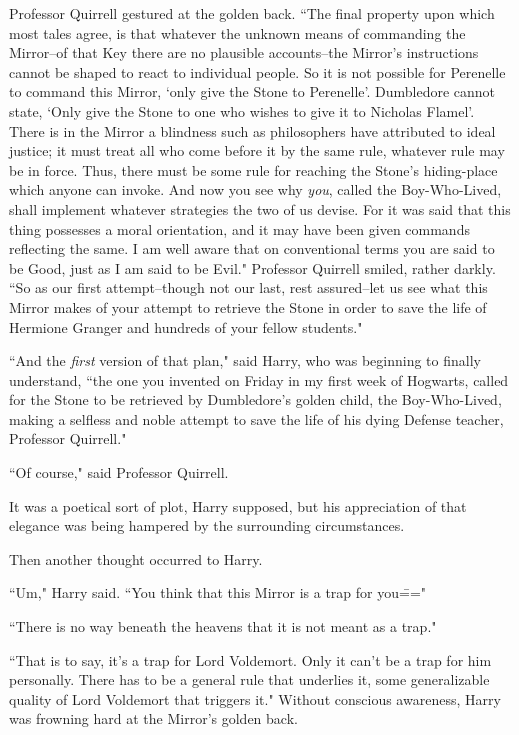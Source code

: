 Professor Quirrell gestured at the golden back. ``The final property upon which most tales agree, is that whatever the unknown means of commanding the Mirror\---of that Key there are no plausible accounts\---the Mirror's instructions cannot be shaped to react to individual people. So it is not possible for Perenelle to command this Mirror, `only give the Stone to Perenelle'. Dumbledore cannot state, `Only give the Stone to one who wishes to give it to Nicholas Flamel'. There is in the Mirror a blindness such as philosophers have attributed to ideal justice; it must treat all who come before it by the same rule, whatever rule may be in force. Thus, there must be some rule for reaching the Stone's hiding-place which anyone can invoke. And now you see why \emph{you}, called the Boy-Who-Lived, shall implement whatever strategies the two of us devise. For it was said that this thing possesses a moral orientation, and it may have been given commands reflecting the same. I am well aware that on conventional terms you are said to be Good, just as I am said to be Evil." Professor Quirrell smiled, rather darkly. ``So as our first attempt\---though not our last, rest assured\---let us see what this Mirror makes of your attempt to retrieve the Stone in order to save the life of Hermione Granger and hundreds of your fellow students."

``And the \emph{first} version of that plan," said Harry, who was beginning to finally understand, ``the one you invented on Friday in my first week of Hogwarts, called for the Stone to be retrieved by Dumbledore's golden child, the Boy-Who-Lived, making a selfless and noble attempt to save the life of his dying Defense teacher, Professor Quirrell."

``Of course," said Professor Quirrell.

It was a poetical sort of plot, Harry supposed, but his appreciation of that elegance was being hampered by the surrounding circumstances.

Then another thought occurred to Harry.

``Um," Harry said. ``You think that this Mirror is a trap for you\==="

``There is no way beneath the heavens that it is not meant as a trap."

``That is to say, it's a trap for Lord Voldemort. Only it can't be a trap for him personally. There has to be a general rule that underlies it, some generalizable quality of Lord Voldemort that triggers it." Without conscious awareness, Harry was frowning hard at the Mirror's golden back.


